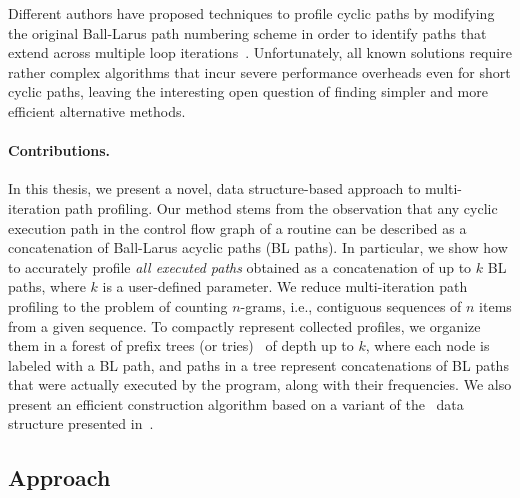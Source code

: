 Different authors have proposed techniques to profile cyclic paths by modifying the original Ball-Larus path numbering scheme in order to identify paths that extend across multiple loop iterations~\cite{Tallam04,Roy09,Li12}. Unfortunately, all known solutions require rather complex algorithms that incur severe performance overheads even for short cyclic paths, leaving the interesting open question of finding simpler and more efficient alternative methods.

\paragraph*{Contributions.} In this thesis, we present a novel, data structure-based approach to multi-iteration path profiling. Our method stems from the observation that any cyclic execution path in the control flow graph of a routine can be described as a concatenation of Ball-Larus acyclic paths (BL paths). In particular, we show how to accurately profile {\em all executed paths} obtained as a concatenation of up to $k$ BL paths, where $k$ is a user-defined parameter. We reduce multi-iteration path profiling to the problem of counting $n$-grams, i.e., contiguous sequences of $n$ items from a given sequence. To compactly represent collected profiles, we organize them in a forest of prefix trees (or tries)~\cite{Fredkin60} of depth up to $k$, where each node is labeled with a BL path, and paths in a tree represent concatenations of BL paths that were actually executed by the program, along with their frequencies. We also present an efficient construction algorithm based on a variant of the \ksf\ data structure presented in~\cite{Ausiello12}. 

\subsection{Approach}

